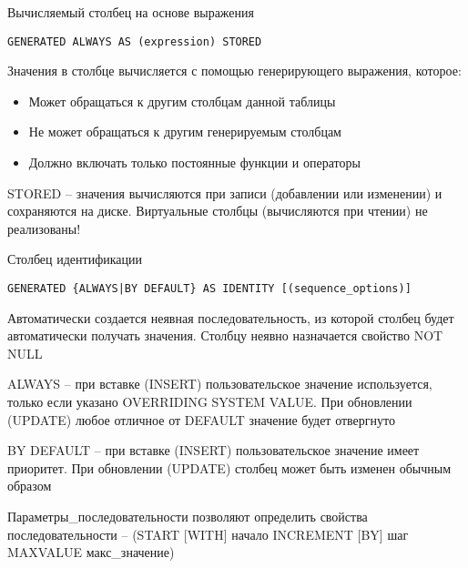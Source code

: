 \documentclass[12pt]{article}
\begin{document}
\begin{nota}{Вычисляемый столбец на основе выражения}
\begin{lstlisting}
GENERATED ALWAYS AS (expression) STORED
\end{lstlisting}

    Значения в столбце вычисляется с помощью генерирующего выражения, которое: 

    \begin{itemize}
        \item Может обращаться к другим столбцам данной таблицы 
        \item Не может обращаться к другим генерируемым столбцам 
        \item Должно включать только постоянные функции и операторы 
    \end{itemize}

    STORED -- значения вычисляются при записи (добавлении или изменении) и сохраняются на диске. Виртуальные столбцы (вычисляются при чтении) не реализованы!
\end{nota}

\begin{nota}{Столбец идентификации}
\begin{lstlisting}
GENERATED {ALWAYS|BY DEFAULT} AS IDENTITY [(sequence_options)]
\end{lstlisting}

    Автоматически создается неявная последовательность, из которой столбец будет автоматически получать значения. Столбцу неявно назначается свойство NOT NULL

    ALWAYS -- при вставке (INSERT) пользовательское значение используется, только если указано OVERRIDING SYSTEM VALUE. При обновлении (UPDATE) любое отличное от DEFAULT значение будет отвергнуто 

    BY DEFAULT -- при вставке (INSERT) пользовательское значение имеет приоритет. При обновлении (UPDATE) столбец может быть изменен обычным образом 

    Параметры\_последовательности позволяют определить свойства последовательности -- (START [WITH] начало INCREMENT [BY] шаг MAXVALUE макс\_значение)
\end{nota}
\end{document}
